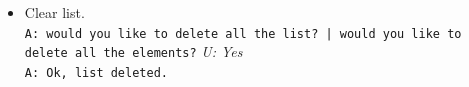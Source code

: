 \begin{itemize}
\begin{itemize}

		
	
		\item Clear list.\\
	    \texttt{A: would you like to delete all the list? |  would you like to delete all the  elements?}
		\textit{U: Yes}\\
		\texttt{A: Ok, list deleted.}
		

\end{itemize}
\end{itemize}
